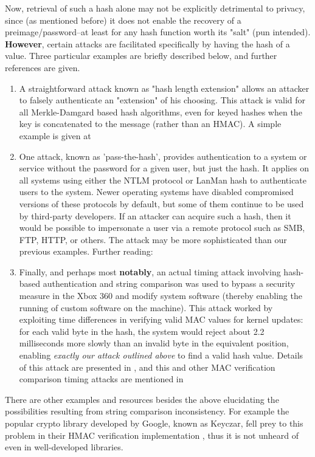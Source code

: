 \documentclass{article}
\begin{document}
Now, retrieval of such a hash alone may not be explicitly detrimental to privacy, since (as mentioned before) it does not enable the recovery of a preimage/password--at least for any hash function worth its "salt" (pun intended). \textbf{However}, certain attacks are facilitated specifically by having the hash of a value. Three particular examples are briefly described below, and further references are given.
\begin{enumerate}
  \item A straightforward attack known as "hash length extension" \cite{whitehathash} allows an attacker to falsely authenticate an "extension" of his choosing. This attack is valid for all Merkle-Damgard based hash algorithms, even for keyed hashes when the key is concatenated to the message (rather than an HMAC). A simple example is given at \cite{wikiexthash}
  \item One attack, known as 'pass-the-hash', provides authentication to a system or service without the password for a given user, but just the hash. It applies on all systems using either the NTLM protocol or LanMan hash to authenticate users to the system. \cite{wikipasshash} Newer operating systems have disabled compromised versions of these protocols by default, but some of them continue to be used by third-party developers. If an attacker can acquire such a hash, then it would be possible to impersonate a user via a remote protocol such as SMB, FTP, HTTP, or others. The attack may be more sophisticated than our previous examples. Further reading: \cite{passhash}
  \item Finally, and perhaps most \textbf{notably}, an actual timing attack involving hash-based authentication and string comparison was used to bypass a security measure in the Xbox 360 and modify system software (thereby enabling the running of custom software on the machine). This attack worked by exploiting time differences in verifying valid MAC values for kernel updates: for each valid byte in the hash, the system would reject about 2.2 milliseconds more slowly than an invalid byte in the equivalent position, enabling \textit{exactly our attack outlined above} to find a valid hash value. Details of this attack are presented in \cite{xbox}, and this and other MAC verification comparison timing attacks are mentioned in \cite{xboxbook}
\end{enumerate}

There are other examples and resources besides the above elucidating the possibilities resulting from string comparison inconsistency. For example the popular crypto library developed by Google, known as Keyczar, fell prey to this problem in their HMAC verification implementation \cite{keyczar}, thus it is not unheard of even in well-developed libraries.
\end{document}
